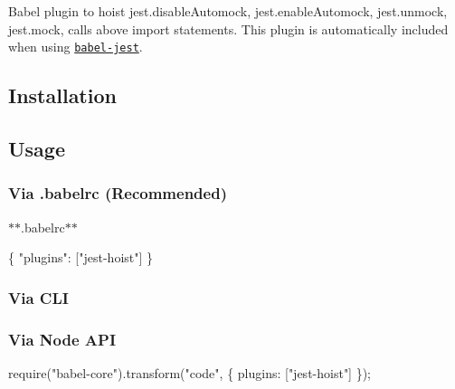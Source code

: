 Babel plugin to hoist {\ttfamily jest.\+disable\+Automock}, {\ttfamily jest.\+enable\+Automock}, {\ttfamily jest.\+unmock}, {\ttfamily jest.\+mock}, calls above {\ttfamily import} statements. This plugin is automatically included when using \href{https://github.com/facebook/jest/tree/master/packages/babel-jest}{\tt babel-\/jest}.

\subsection*{Installation}




\subsection*{Usage}

\subsubsection*{Via {\ttfamily .babelrc} (Recommended)}

$\ast$$\ast$.babelrc$\ast$$\ast$


\begin{DoxyCode}
\{
  "plugins": ["jest-hoist"]
\}
\end{DoxyCode}


\subsubsection*{Via C\+LI}




\subsubsection*{Via Node A\+PI}


\begin{DoxyCode}
require("babel-core").transform("code", \{
  plugins: ["jest-hoist"]
\});
\end{DoxyCode}
 